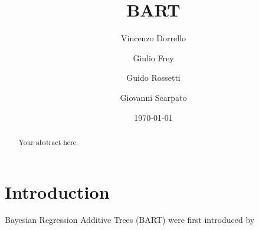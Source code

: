 \documentclass[a4paper,12pt]{article}
\title{BART}
\author{
    Vincenzo Dorrello 
    \and
    Giulio Frey 
    \and
    Guido Rossetti 
    \and
    Giovanni Scarpato 
}
\date{\today}
\begin{document}
\maketitle

\begin{abstract}
Your abstract here.
\end{abstract}


\section{Introduction}

Bayesian Regression Additive Trees (BART) were first introduced by \cite{chipmanBARTBayesianAdditive2010}

\newpage

\printbibliography
\end{document}
